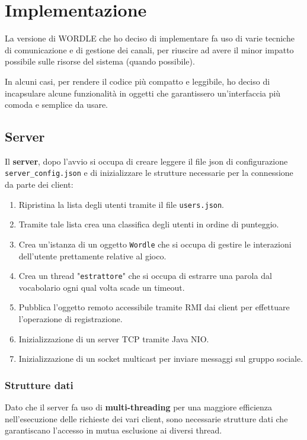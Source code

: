 \section{Implementazione}
La versione di WORDLE che ho deciso di implementare fa uso di varie tecniche di comunicazione
e di gestione dei canali, per riuscire ad avere il minor impatto possibile sulle risorse del
sistema (quando possibile).

In alcuni casi, per rendere il codice più compatto e leggibile, ho deciso di incapsulare alcune
funzionalità in oggetti che garantissero un'interfaccia più comoda e semplice da usare.

\subsection{Server}
Il \textbf{server}, dopo l'avvio si occupa di creare leggere il file json di configurazione
\verb|server_config.json| e di inizializzare le strutture necessarie per la connessione da parte
dei client:
\begin{enumerate}
	\item Ripristina la lista degli utenti tramite il file \verb|users.json|.
	\item Tramite tale lista crea una classifica degli utenti in ordine di punteggio.
	\item Crea un'istanza di un oggetto \verb|Wordle| che si occupa di gestire le interazioni
	      dell'utente prettamente relative al gioco.
	\item Crea un thread "\verb|estrattore|" che si occupa di estrarre una parola dal vocabolario
	      ogni qual volta scade un timeout.
	\item Pubblica l'oggetto remoto accessibile tramite RMI dai client per effettuare l'operazione
	      di registrazione.
	\item Inizializzazione di un server TCP tramite Java NIO.
	\item Inizializzazione di un socket multicast per inviare messaggi sul gruppo sociale.
\end{enumerate}

\subsubsection{Strutture dati}
Dato che il server fa uso di \textbf{multi-threading} per una maggiore efficienza nell'esecuzione
delle richieste dei vari client, sono necessarie strutture dati che garantiscano l'accesso in
mutua esclusione ai diversi thread.

